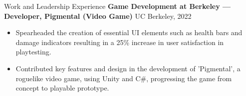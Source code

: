 \documentclass{resume}
\begin{document}
\begin{rSection}{Work and Leadership Experience}
\textbf{Game Development at Berkeley — Developer, Pigmental (Video Game)} \hfill UC Berkeley, 2022
\begin{itemize}
  \item Spearheaded the creation of essential UI elements such as health bars and damage indicators resulting in a 25\% increase in user satisfaction in playtesting.
  \item Contributed key features and design in the development of 'Pigmental', a roguelike video game, using Unity and C\#, progressing the game from concept to playable prototype.
\end{itemize}

\end{rSection}

\end{document}
